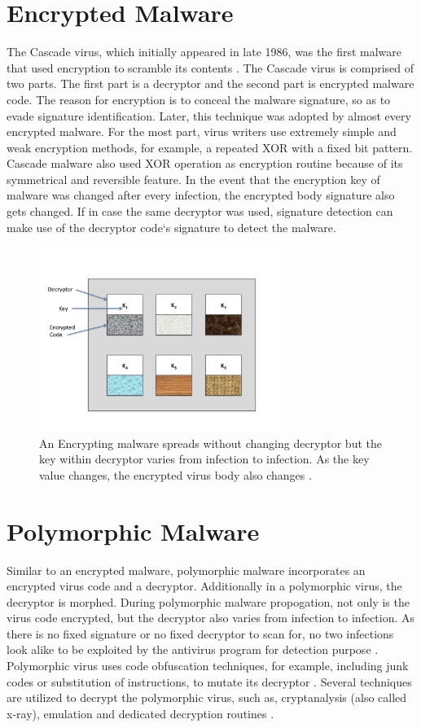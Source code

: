 \section{Encrypted Malware} 

The Cascade virus, which initially appeared in late 1986, was the first malware that used encryption to scramble its contents \cite{bib11}. The Cascade virus is comprised of two parts. The first part is a decryptor and the second part is encrypted malware code. The reason for encryption is to conceal the malware signature, so as to evade signature identification. Later, this technique was adopted by almost every encrypted malware.  For the most part, virus writers use extremely simple and weak encryption methods, for example, a repeated XOR with a fixed bit pattern. Cascade malware also used XOR operation as encryption routine because of its symmetrical and reversible feature. In the event that the encryption key of malware was changed after every infection, the encrypted body signature also gets changed. If in case the same decryptor was used, signature detection can make use of the decryptor code`s signature to detect the malware.
\begin{figure}
    \centering    
    \includegraphics[width=8cm, height=6cm]{encryptedvirus.jpg}
    \caption[Encrypted Malware Replication]{An Encrypting malware spreads without changing decryptor but the key within decryptor varies from infection to infection. As the key value changes, the encrypted virus body also changes \cite{bib14}.}
\end{figure}
\section{Polymorphic Malware} 

Similar to an encrypted malware, polymorphic malware incorporates an encrypted virus code and a decryptor. Additionally in a polymorphic virus, the decryptor is morphed. During polymorphic malware propogation, not only is the virus code encrypted, but the decryptor also varies from infection to infection. As there is no fixed signature or no fixed decryptor to scan for, no two infections look alike to be exploited by the antivirus program for detection purpose \cite{bib14}. Polymorphic virus uses code obfuscation techniques, for example, including junk codes or substitution of instructions, to mutate its decryptor \cite{bib18}.
Several techniques are utilized to decrypt the polymorphic virus, such as, cryptanalysis (also called x-ray), emulation and dedicated decryption routines \cite{bib21}.

